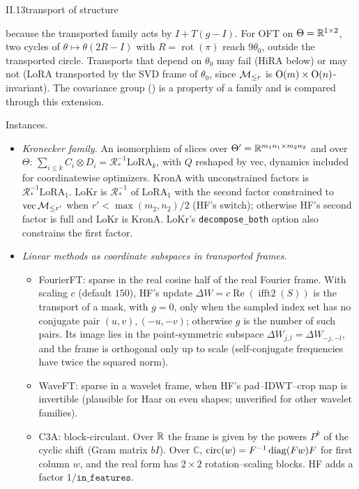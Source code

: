 \begin{proposition}{II.13}{transport of structure}
\begin{itemize}
    because the transported family acts by $I+T(g-I)$. For OFT on $\Theta=\mathbb{R}^{1\times2}$, two cycles of
    $\theta\mapsto\theta(2R-I)$ with $R=\operatorname{rot}(\pi)$ reach $9\theta_0$, outside the transported circle.
    Transports that depend on $\theta_0$ may fail (HiRA below) or may not (LoRA transported by the SVD frame of
    $\theta_0$, since $\mathcal{M}_{\le r}$ is $\mathrm{O}(m)\times\mathrm{O}(n)$-invariant). The covariance group () is a
    property of a family and is compared through this extension.
\end{itemize}
Instances.
\begin{itemize}
  \item \emph{Kronecker family.} An isomorphism of slices over $\Theta'=\mathbb{R}^{m_1n_1\times m_2n_2}$ and over $\Theta$:
    $\sum_{i\le k}C_i\otimes D_i=\mathcal R^{-1}_*\mathrm{LoRA}_k$, with $Q$ reshaped by vec, dynamics included for
    coordinatewise optimizers. KronA with unconstrained factors is $\mathcal R^{-1}_*\mathrm{LoRA}_1$. LoKr is
    $\mathcal R^{-1}_*$ of $\mathrm{LoRA}_1$ with the second factor constrained to $\operatorname{vec}\mathcal{M}_{\le r'}$ when
    $r'<\max(m_2,n_2)/2$ (HF's switch); otherwise HF's second factor is full and LoKr is KronA. LoKr's
    \texttt{decompose\_both} option also constrains the first factor.
  \item \emph{Linear methods as coordinate subspaces in transported frames.}
  \begin{itemize}
    \item FourierFT: sparse in the real cosine half of the real Fourier frame. With scaling $c$ (default $150$), HF's
      update $\Delta W=c\operatorname{Re}(\operatorname{ifft2}(S))$ is the transport of a mask, with $g=0$, only when the sampled index set has no conjugate pair $(u,v),(-u,-v)$; otherwise $g$ is the
      number of such pairs. Its image lies in the point-symmetric subspace $\Delta W_{j,l}=\Delta W_{-j,-l}$, and the
      frame is orthogonal only up to scale (self-conjugate frequencies have twice the squared norm).
    \item WaveFT: sparse in a wavelet frame, when HF's pad--IDWT--crop map is invertible (plausible for Haar on even
      shapes; unverified for other wavelet families).
    \item C3A: block-circulant. Over $\mathbb{R}$ the frame is given by the powers $P^k$ of the cyclic shift (Gram matrix
      $bI$). Over $\mathbb C$, $\operatorname{circ}(w)=F^{-1}\operatorname{diag}(Fw)F$ for first column $w$, and the real form has
      $2\times2$ rotation--scaling blocks. HF adds a factor $1/\texttt{in\_features}$.

\end{itemize}
\end{itemize}
\end{proposition}
